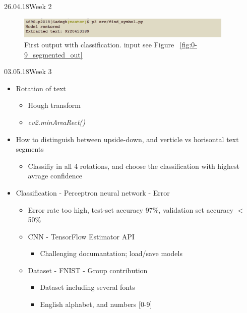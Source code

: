 \documentclass[11pt,a4paper,UKenglish]{article}
\begin{document}
\begin{loggentry}{26.04.18}{Week 2}
\begin{itemize}
\begin{itemize}
\begin{itemize}
        \begin{figure}[H]
          \centering
          \includegraphics[height=1cm]{../res/classification_first_print.png}
          \caption{First output with classification. input see Figure ~\ref{fig:0-9_segmented_out}}
          \label{fig:classification_first_print}
        \end{figure}

      \end{itemize}
    \end{itemize}
\end{itemize}
\end{loggentry}


\newpage
\begin{loggentry}{03.05.18}{Week 3}
\begin{itemize}
  \item{Rotation of text}
  \begin{itemize}
    \item{Hough transform}
    \item{\textit{cv2.minAreaRect()}}
  \end{itemize}
  \item{How to distinguish between upside-down, and verticle vs horisontal text segments}
  \begin{itemize}
    \item{Classifiy in all 4 rotations, and choose the classification with highest avrage confidence}
  \end{itemize}
  \item{Classification - Perceptron neural network - Error}
  \begin{itemize}
    \item{Error rate too high, test-set accuracy 97\%, validation set accuracy $<$ 50\%}
    \item{CNN - TensorFlow Estimator API}
    \begin{itemize}
      \item{Challenging documantation; load/save models}
    \end{itemize}
    \item{Dataset - FNIST - Group contribution}
    \begin{itemize}
      \item{Dataset including several fonts}
      \item{English alphabet, and numbers [0-9]}
    \end{itemize}
  \end{itemize}
\end{itemize}
\end{loggentry}
\end{document}
